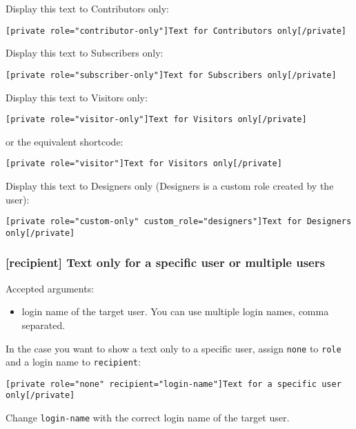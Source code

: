 \documentclass[a4paper,10pt]{article}
\begin{document}
Display this text to Contributors only:

\begin{lstlisting}
[private role="contributor-only"]Text for Contributors only[/private]
\end{lstlisting}

Display this text to Subscribers only:

\begin{lstlisting}
[private role="subscriber-only"]Text for Subscribers only[/private]
\end{lstlisting}

Display this text to Visitors only:

\begin{lstlisting}
[private role="visitor-only"]Text for Visitors only[/private]
\end{lstlisting}

or the equivalent shortcode:

\begin{lstlisting}
[private role="visitor"]Text for Visitors only[/private]
\end{lstlisting}

Display this text to Designers only (Designers is a custom role created by the user):

\begin{lstlisting}
[private role="custom-only" custom_role="designers"]Text for Designers only[/private]
\end{lstlisting}

\subsubsection{[recipient] Text only for a specific user or multiple users}

Accepted arguments:

\begin{itemize}
 \item login name of the target user. You can use multiple login names, comma separated.
\end{itemize}

In the case you want to show a text only to a specific user, assign \verb+none+ to \verb+role+ and a login name to \verb+recipient+:

\begin{lstlisting}
[private role="none" recipient="login-name"]Text for a specific user only[/private]
\end{lstlisting}

Change \verb+login-name+ with the correct login name of the target user.
\end{document}
